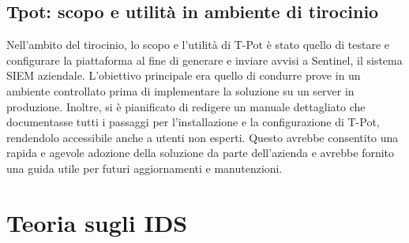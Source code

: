 \documentclass[12pt,a4paper,oneside,onecolumn,openright]{book}
\begin{document}
\subsection{Tpot: scopo e utilità in ambiente di tirocinio}
Nell'ambito del tirocinio, lo scopo e l'utilità di T-Pot è stato quello di testare e 
configurare la piattaforma al fine di generare e inviare avvisi a Sentinel, il sistema 
SIEM aziendale. L'obiettivo principale era quello di condurre prove in un ambiente 
controllato prima di implementare la soluzione su un server in produzione. 
Inoltre, si è pianificato di redigere un manuale dettagliato che documentasse tutti i 
passaggi per l'installazione e la configurazione di T-Pot, rendendolo accessibile anche 
a utenti non esperti. Questo avrebbe consentito una rapida e agevole adozione della 
soluzione da parte dell'azienda e avrebbe fornito una guida utile per futuri aggiornamenti e manutenzioni.
\newpage

\section{Teoria sugli IDS}
\end{document}
